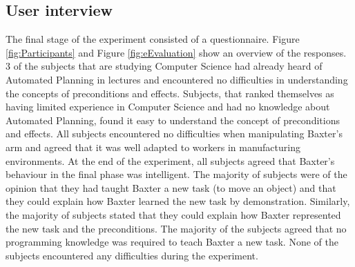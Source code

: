 \subsection{User interview}
The final stage of the experiment consisted of a questionnaire. Figure \ref{fig:Participants} and Figure \ref{fig:eEvaluation} show an overview of the responses.
3 of the subjects that are studying Computer Science had already heard of Automated Planning in lectures and encountered no difficulties in understanding the concepts of preconditions and effects.
Subjects, that ranked themselves as having limited experience in Computer Science and had no knowledge about Automated Planning, found it easy to understand the concept of preconditions and effects.
All subjects encountered no difficulties when manipulating Baxter's arm and agreed that it was well adapted to workers in manufacturing environments.
At the end of the experiment, all subjects agreed that Baxter's behaviour in the final phase was intelligent. The majority of subjects were of the opinion that they had taught Baxter a new task (to move an object) and that they could explain how Baxter learned the new task by demonstration. Similarly, the majority of subjects stated that they could explain how Baxter represented the new task and the preconditions.
The majority of the subjects agreed that no programming knowledge was required to teach Baxter a new task. None of the subjects encountered any difficulties during the experiment.

